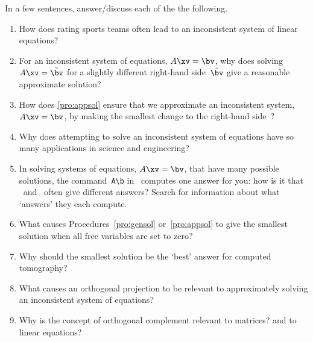 \begin{exercise} \label{ex:} 
In a few sentences, answer\slash discuss each of the the following.
\begin{enumerate}
\item How does rating sports teams often lead to an inconsistent system of linear equations?

\item For an inconsistent system of equations, \(A\xv=\bv\), why does solving \(A\xv=\tilde\bv\) for a slightly different right-hand side~\(\tilde\bv\) give a reasonable approximate solution?

\item How does \autoref{pro:appsol} ensure that we approximate an inconsistent system, \(A\xv=\bv\), by making the smallest change to the right-hand side~\bv?

\item Why does attempting to solve an inconsistent system of equations have so many applications in science and engineering?

\item In solving systems of equations, \(A\xv=\bv\), that have many possible solutions, the command~\verb|A\b| in \script\ computes one answer for you: how is it that \script[0]\ and \script[1]\ often give different answers?  Search for information about what `answers' they each compute.

\item What causes Procedures~\ref{pro:gensol} or~\ref{pro:appsol} to give the smallest solution when all free variables are set to zero?

\item Why should the smallest solution be the `best' answer for computed tomography?

\item What causes an orthogonal projection to be relevant to approximately solving an inconsistent system of equations?


\item Why is the concept of orthogonal complement relevant to matrices?  and to linear equations?

\end{enumerate}
\end{exercise}

\begin{comment}%
why, what caused X?
how did X occur?
what-if? what-if-not?
how does X compare with Y?
what is the evidence for X?
why is X important?
\end{comment}


